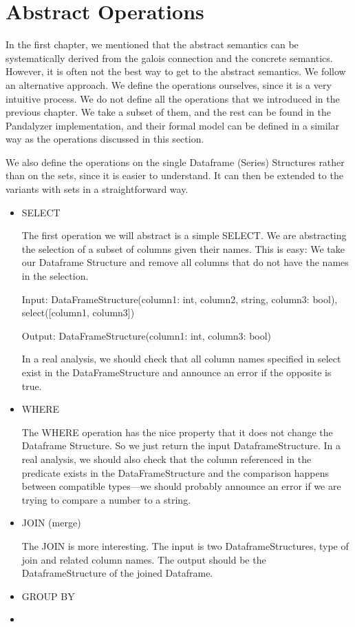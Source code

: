 \section{Abstract Operations}

In the first chapter, we mentioned that the abstract semantics can be systematically derived from the galois connection
and the concrete semantics.
However, it is often not the best way to get to the abstract semantics.
We follow an alternative approach.
We define the operations ourselves, since it is a very intuitive process.
We do not define all the operations that we introduced in the previous chapter.
We take a subset of them, and the rest can be found in the Pandalyzer implementation, and their formal model can be
defined in a similar way as the operations discussed in this section.

We also define the operations on the single Dataframe (Series) Structures rather than on the sets, since it is
easier to understand.
It can then be extended to the variants with sets in a straightforward way.

\begin{itemize}
    \item SELECT

    The first operation we will abstract is a simple SELECT\@.
    We are abstracting the selection of a subset of columns given their names.
    This is easy: We take our Dataframe Structure and remove all columns that do not have the names in the selection.
    \begin{example}

        Input: DataFrameStructure(column1: int, column2, string, column3: bool), select([column1, column3])

        Output: DataFrameStructure(column1: int, column3: bool)
    \end{example}
    In a real analysis, we should check that all column names specified in select exist in the DataFrameStructure and
    announce an error if the opposite is true.

    \item WHERE

    The WHERE operation has the nice property that it does not change the Dataframe Structure.
    So we just return the input DataframeStructure.
    In a real analysis, we should also check that the column referenced in the predicate exists in the DataFrameStructure
    and the comparison happens between compatible types---we should probably announce an error if we are trying to compare
    a number to a string.

    \item JOIN (merge)

    The JOIN is more interesting.
    The input is two DataframeStructures, type of join and related column names.
    The output should be the DataframeStructure of the joined Dataframe.

    \item GROUP BY 



    \item {}


\end{itemize}

